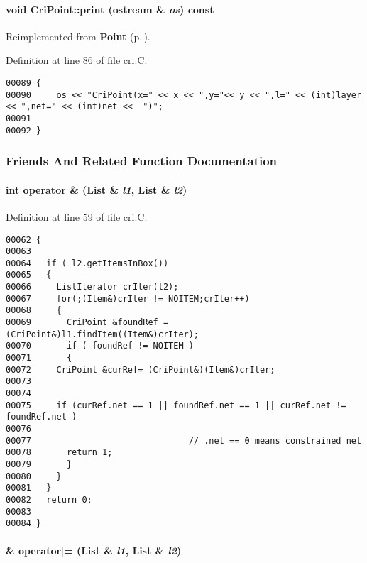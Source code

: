 \paragraph{\setlength{\rightskip}{0pt plus 5cm}void Cri\-Point::print (ostream \& {\em os}) const\hspace{0.3cm}{\tt  [virtual]}}\hfill



Reimplemented from {\bf Point} {\rm (p.\,\pageref{Point_a6})}.

Definition at line 86 of file cri.C.\small\begin{verbatim}00089 {
00090     os << "CriPoint(x=" << x << ",y="<< y << ",l=" << (int)layer << ",net=" << (int)net <<  ")";
00091 
00092 }
\end{verbatim}\normalsize 


\subsubsection{Friends And Related Function Documentation}
\label{CriPoint_l1}
\paragraph{\setlength{\rightskip}{0pt plus 5cm}int operator \& ({\bf List} \& {\em l1}, {\bf List} \& {\em l2})\hspace{0.3cm}{\tt  [friend]}}\hfill



Definition at line 59 of file cri.C.\small\begin{verbatim}00062 {
00063 
00064   if ( l2.getItemsInBox())
00065   {  
00066     ListIterator crIter(l2);
00067     for(;(Item&)crIter != NOITEM;crIter++)
00068     {
00069       CriPoint &foundRef = (CriPoint&)l1.findItem((Item&)crIter);
00070       if ( foundRef != NOITEM )
00071       {
00072     CriPoint &curRef= (CriPoint&)(Item&)crIter;
00073 
00074 
00075     if (curRef.net == 1 || foundRef.net == 1 || curRef.net != foundRef.net )
00076 
00077                               // .net == 0 means constrained net
00078       return 1;
00079       }
00080     }  
00081   }
00082   return 0;
00083  
00084 }
\end{verbatim}\normalsize 
\label{CriPoint_l0}
\paragraph{\& operator$|$= ({\bf List} \& {\em l1}, {\bf List} \& {\em l2})\hspace{0.3cm}{\tt  [friend]}}\hfill



